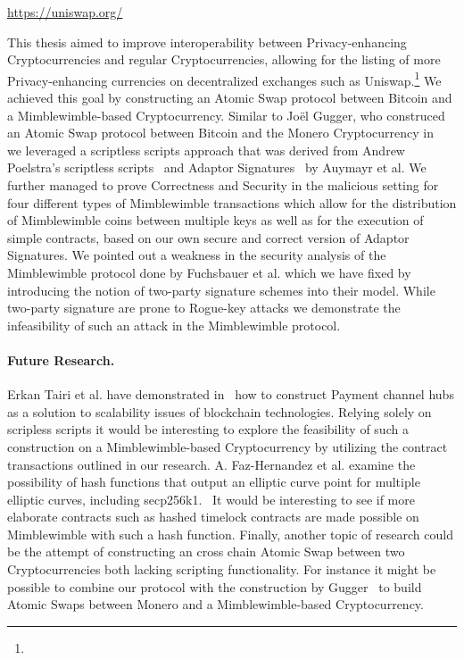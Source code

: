 \urldef{\urluniswp}\url{https://uniswap.org/}

This thesis aimed to improve interoperability between Privacy-enhancing Cryptocurrencies and regular Cryptocurrencies, allowing for the listing of more Privacy-enhancing currencies on decentralized exchanges such as Uniswap.\footnote{\urluniswp}
We achieved this goal by constructing an Atomic Swap protocol between Bitcoin and a Mimblewimble-based Cryptocurrency.
Similar to Joël Gugger, who construced an Atomic Swap protocol between Bitcoin and the Monero Cryptocurrency in~\cite{gugger2020bitcoin} we leveraged a scriptless scripts approach that was derived from Andrew Poelstra's scriptless scripts~\cite{poelstra2017scriptless} and Adaptor Signatures~\cite{aumayr2020bitcoinchannels} by Auymayr et al.
We further managed to prove Correctness and Security in the malicious setting for four different types of Mimblewimble transactions which allow for the distribution of Mimblewimble coins between multiple keys as well as for the execution of simple contracts, based on our own secure and correct version of Adaptor Signatures.
We pointed out a weakness in the security analysis of the Mimblewimble protocol done by Fuchsbauer et al. which we have fixed by introducing the notion of two-party signature schemes into their model.
While two-party signature are prone to Rogue-key attacks we demonstrate the infeasibility of such an attack in the Mimblewimble protocol.

\paragraph{Future Research.} Erkan Tairi et al. have demonstrated in~\cite{tairi2019a2l} how to construct Payment channel hubs as a solution to scalability issues of blockchain technologies.
Relying solely on scripless scripts it would be interesting to explore the feasibility of such a construction on a Mimblewimble-based Cryptocurrency by utilizing the contract transactions outlined in our research.
A. Faz-Hernandez et al. examine the possibility of hash functions that output an elliptic curve point for multiple elliptic curves, including secp256k1.~\cite{hernandez2020hashing} It would be interesting to see if more elaborate contracts such as hashed timelock contracts are made possible on Mimblewimble with such a hash function.
Finally, another topic of research could be the attempt of constructing an cross chain Atomic Swap between two Cryptocurrencies both lacking scripting functionality.
For instance it might be possible to combine our protocol with the construction by Gugger~\cite{gugger2020bitcoin} to build Atomic Swaps between Monero and a Mimblewimble-based Cryptocurrency.


